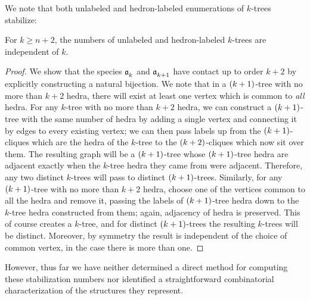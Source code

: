 \documentclass[distribution,draft]{brandiss} %
\numberwithin{section}{chapter}
\numberwithin{figure}{chapter}
\begin{document}
We note that both unlabeled and hedron-labeled enumerations of $k$-trees stabilize:
\begin{theorem}
  \label{thm:ktreestab}
  For $k \geq n + 2$, the numbers of unlabeled and hedron-labeled $k$-trees are independent of $k$.
\end{theorem}
\begin{proof}
  We show that the species $\mathfrak{a}_{k}^{}$ and $\mathfrak{a}_{k+1}^{}$ have contact up to order $k+2$ by explicitly constructing a natural bijection.
  We note that in a $\left( {k+1} \right)$-tree with no more than $k+2$ hedra, there will exist at least one vertex which is common to \emph{all} hedra.
  For any $k$-tree with no more than $k+2$ hedra, we can construct a $\left( {k+1} \right)$-tree with the same number of hedra by adding a single vertex and connecting it by edges to every existing vertex; we can then pass labels up from the $\left( {k+1} \right)$-cliques which are the hedra of the $k$-tree to the $\left( {k+2} \right)$-cliques which now sit over them.
  The resulting graph will be a $\left( {k+1} \right)$-tree whose $\left( {k+1} \right)$-tree hedra are adjacent exactly when the $k$-tree hedra they came from were adjacent.
  Therefore, any two distinct $k$-trees will pass to distinct $\left( {k+1} \right)$-trees.
  Similarly, for any $\left( {k+1} \right)$-tree with no more than $k+2$ hedra, choose one of the vertices common to all the hedra and remove it, passing the labels of $\left( {k+1} \right)$-tree hedra down to the $k$-tree hedra constructed from them; again, adjacency of hedra is preserved.
  This of course creates a $k$-tree, and for distinct $\left( {k+1} \right)$-trees the resulting $k$-trees will be distinct.
  Moreover, by symmetry the result is independent of the choice of common vertex, in the case there is more than one.
\end{proof}
However, thus far we have neither determined a direct method for computing these stabilization numbers nor identified a straightforward combinatorial characterization of the structures they represent.
\end{document}
